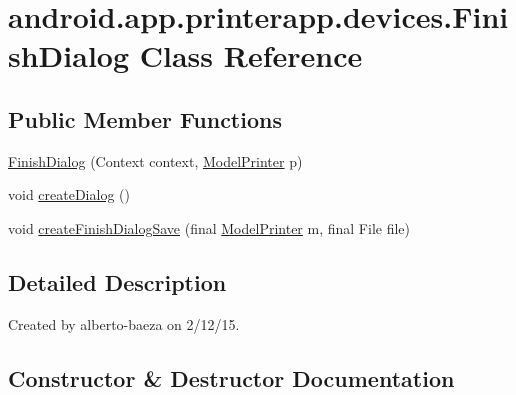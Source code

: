\hypertarget{classandroid_1_1app_1_1printerapp_1_1devices_1_1_finish_dialog}{}\section{android.\+app.\+printerapp.\+devices.\+Finish\+Dialog Class Reference}
\label{classandroid_1_1app_1_1printerapp_1_1devices_1_1_finish_dialog}
\subsection*{Public Member Functions}
\begin{DoxyCompactItemize}
\item 
\hyperlink{classandroid_1_1app_1_1printerapp_1_1devices_1_1_finish_dialog_aedef434081735c1847b1e6b0ad64be00}{Finish\+Dialog} (Context context, \hyperlink{classandroid_1_1app_1_1printerapp_1_1model_1_1_model_printer}{Model\+Printer} p)
\item 
void \hyperlink{classandroid_1_1app_1_1printerapp_1_1devices_1_1_finish_dialog_a4ba985c67b83fae3c950b88a265318c3}{create\+Dialog} ()
\item 
void \hyperlink{classandroid_1_1app_1_1printerapp_1_1devices_1_1_finish_dialog_a0ad359a3d9f21bc7a51f071caf1e1b8d}{create\+Finish\+Dialog\+Save} (final \hyperlink{classandroid_1_1app_1_1printerapp_1_1model_1_1_model_printer}{Model\+Printer} m, final File file)
\end{DoxyCompactItemize}


\subsection{Detailed Description}
Created by alberto-\/baeza on 2/12/15. 

\subsection{Constructor \& Destructor Documentation}
\mbox{\label{classandroid_1_1app_1_1printerapp_1_1devices_1_1_finish_dialog_aedef434081735c1847b1e6b0ad64be00}} 
